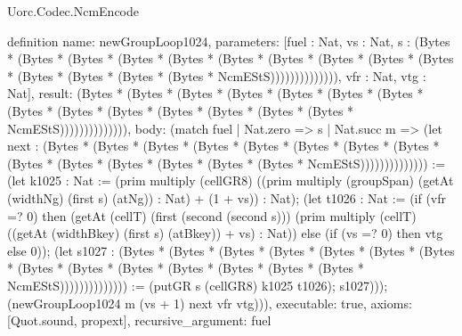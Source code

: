 \begin{lexlean}{Uorc.Codec.NcmEncode}
\begin{semanticmodule}
definition{
  name: newGroupLoop1024,
  parameters: [fuel : Nat, vs : Nat, s : (Bytes * (Bytes * (Bytes * (Bytes * (Bytes * (Bytes * (Bytes * (Bytes * (Bytes * (Bytes * (Bytes * (Bytes * (Bytes * (Bytes * NcmEStS)))))))))))))), vfr : Nat, vtg : Nat],
  result: (Bytes * (Bytes * (Bytes * (Bytes * (Bytes * (Bytes * (Bytes * (Bytes * (Bytes * (Bytes * (Bytes * (Bytes * (Bytes * (Bytes * NcmEStS)))))))))))))),
  body: (match fuel
    | Nat.zero => s
    | Nat.succ m => (let next : (Bytes * (Bytes * (Bytes * (Bytes * (Bytes * (Bytes * (Bytes * (Bytes * (Bytes * (Bytes * (Bytes * (Bytes * (Bytes * (Bytes * NcmEStS)))))))))))))) := (let k1025 : Nat := (prim multiply (cellGR8) ((prim multiply (groupSpan) (getAt (widthNg) (first s) (atNg)) : Nat) + (1 + vs)) : Nat); (let t1026 : Nat := (if (vfr =? 0) then (getAt (cellT) (first (second (second s))) (prim multiply (cellT) ((getAt (widthBkey) (first s) (atBkey)) + vs) : Nat)) else (if (vs =? 0) then vtg else 0)); (let s1027 : (Bytes * (Bytes * (Bytes * (Bytes * (Bytes * (Bytes * (Bytes * (Bytes * (Bytes * (Bytes * (Bytes * (Bytes * (Bytes * (Bytes * NcmEStS)))))))))))))) := (putGR s (cellGR8) k1025 t1026); s1027))); (newGroupLoop1024 m (vs + 1) next vfr vtg))),
  executable: true,
  axioms: [Quot.sound, propext],
  recursive_argument: fuel
}


\end{semanticmodule}
\end{lexlean}
